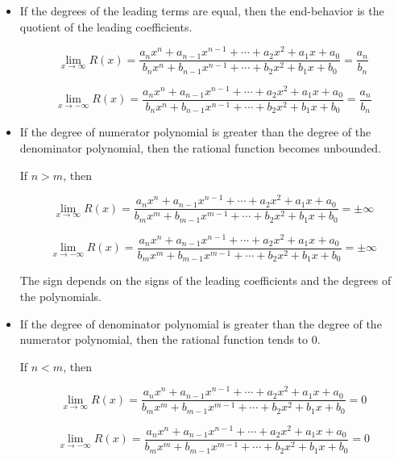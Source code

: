 \documentclass{ximera}
\begin{document}
\begin{itemize}
\item If the degrees of the leading terms are equal, then the end-behavior is the quotient of the leading coefficients.


\[   \lim\limits_{x \to \infty} R(x) = \frac{a_n x^n + a_{n-1} x^{n-1} + \cdots + a_2 x^2 + a_1 x + a_0}{b_n x^n + b_{n-1} x^{n-1} + \cdots + b_2 x^2 + b_1 x + b_0}  = \frac{a_n}{b_n}      \]


\[   \lim\limits_{x \to -\infty} R(x) = \frac{a_n x^n + a_{n-1} x^{n-1} + \cdots + a_2 x^2 + a_1 x + a_0}{b_n x^n + b_{n-1} x^{n-1} + \cdots + b_2 x^2 + b_1 x + b_0}  = \frac{a_n}{b_n}      \]



\item If the degree of numerator polynomial is greater than the degree of the denominator polynomial, then the rational function becomes unbounded.

If $n > m$, then 

\[   \lim\limits_{x \to \infty} R(x) = \frac{a_n x^n + a_{n-1} x^{n-1} + \cdots + a_2 x^2 + a_1 x + a_0}{b_m x^m + b_{m-1} x^{m-1} + \cdots + b_2 x^2 + b_1 x + b_0} = \pm\infty       \]


\[   \lim\limits_{x \to -\infty} R(x) = \frac{a_n x^n + a_{n-1} x^{n-1} + \cdots + a_2 x^2 + a_1 x + a_0}{b_m x^m + b_{m-1} x^{m-1} + \cdots + b_2 x^2 + b_1 x + b_0} = \pm\infty       \]

The sign depends on the signs of the leading coefficients and the degrees of the polynomials.


\item If the degree of denominator polynomial is greater than the degree of the numerator polynomial, then the rational function tends to $0$.

If $n < m$, then 

\[   \lim\limits_{x \to \infty} R(x) = \frac{a_n x^n + a_{n-1} x^{n-1} + \cdots + a_2 x^2 + a_1 x + a_0}{b_m x^m + b_{m-1} x^{m-1} + \cdots + b_2 x^2 + b_1 x + b_0} = 0      \]


\[   \lim\limits_{x \to -\infty} R(x) = \frac{a_n x^n + a_{n-1} x^{n-1} + \cdots + a_2 x^2 + a_1 x + a_0}{b_m x^m + b_{m-1} x^{m-1} + \cdots + b_2 x^2 + b_1 x + b_0} = 0      \]

\end{itemize}
\end{document}
